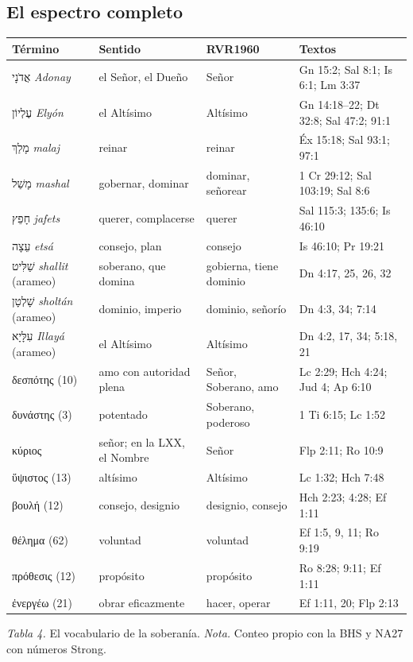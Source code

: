 \documentclass[11pt,letterpaper]{article}
\newcommand{\heb}[1]{\mbox{\foreignlanguage{hebrew}{#1}}}
\newcommand{\grc}[1]{\foreignlanguage{ancientgreek}{#1}}
\begin{document}
\subsection{El espectro completo}
\begin{center}\small\renewcommand{\arraystretch}{1.15}
\begin{tabular}{@{}L{3.6cm}L{3.4cm}L{2.6cm}L{4.2cm}@{}}
\toprule
\textbf{Término} & \textbf{Sentido} & \textbf{RVR1960} & \textbf{Textos} \\ \midrule
\heb{אֲדֹנָי} \emph{Adonay} & el Señor, el Dueño & Señor & Gn 15:2; Sal 8:1; Is 6:1; Lm 3:37 \\
\heb{עֶלְיוֹן} \emph{Elyón} & el Altísimo & Altísimo & Gn 14:18--22; Dt 32:8; Sal 47:2; 91:1 \\
\heb{מָלַךְ} \emph{malaj} & reinar & reinar & Éx 15:18; Sal 93:1; 97:1 \\
\heb{מָשַׁל} \emph{mashal} & gobernar, dominar & dominar, señorear & 1 Cr 29:12; Sal 103:19; Sal 8:6 \\
\heb{חָפֵץ} \emph{jafets} & querer, complacerse & querer & Sal 115:3; 135:6; Is 46:10 \\
\heb{עֵצָה} \emph{etsá} & consejo, plan & consejo & Is 46:10; Pr 19:21 \\ \midrule
\heb{שַׁלִּיט} \emph{shallit} (arameo) & soberano, que domina & gobierna, tiene dominio & Dn 4:17, 25, 26, 32 \\
\heb{שָׁלְטָן} \emph{sholtán} (arameo) & dominio, imperio & dominio, señorío & Dn 4:3, 34; 7:14 \\
\heb{עִלָּיָא} \emph{Illayá} (arameo) & el Altísimo & Altísimo & Dn 4:2, 17, 34; 5:18, 21 \\ \midrule
\grc{δεσπότης} (10) & amo con autoridad plena & Señor, Soberano, amo & Lc 2:29; Hch 4:24; Jud 4; Ap 6:10 \\
\grc{δυνάστης} (3) & potentado & Soberano, poderoso & 1 Ti 6:15; Lc 1:52 \\
\grc{κύριος} & señor; en la LXX, el Nombre & Señor & Flp 2:11; Ro 10:9 \\
\grc{ὕψιστος} (13) & altísimo & Altísimo & Lc 1:32; Hch 7:48 \\
\grc{βουλή} (12) & consejo, designio & designio, consejo & Hch 2:23; 4:28; Ef 1:11 \\
\grc{θέλημα} (62) & voluntad & voluntad & Ef 1:5, 9, 11; Ro 9:19 \\
\grc{πρόθεσις} (12) & propósito & propósito & Ro 8:28; 9:11; Ef 1:11 \\
\grc{ἐνεργέω} (21) & obrar eficazmente & hacer, operar & Ef 1:11, 20; Flp 2:13 \\
\bottomrule
\end{tabular}\par
{\footnotesize\color{gris}\textit{Tabla 4.} El vocabulario de la soberanía. \textit{Nota.} Conteo propio con la BHS y NA27 con números Strong.}
\end{center}
\end{document}
